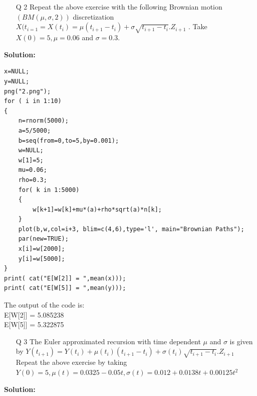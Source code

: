 \documentclass[12pt]{book}
\begin{document}
\newpage


\begin{enumerate}
\item[Q 2] Repeat the above exercise with the following Brownian motion $(BM(\mu,\sigma ,2 ))$ discretization $X(t_{i=1}= X(t_i)= \mu(t_{i+1}-t_i) + \sigma \sqrt{t_{i+1}-t_i}. Z_{i+1} $ . Take $X(0)=5 , \mu= 0.06 $ and $ \sigma =0.3 $.\\

\end{enumerate}
\textbf{Solution:}


\begin{lstlisting}
x=NULL;
y=NULL;
png("2.png");
for ( i in 1:10)
{
	n=rnorm(5000);
	a=5/5000;
	b=seq(from=0,to=5,by=0.001);
	w=NULL;
	w[1]=5;
	mu=0.06;
	rho=0.3;
	for( k in 1:5000)
	{
		w[k+1]=w[k]+mu*(a)+rho*sqrt(a)*n[k];
	}
	plot(b,w,col=i+3, blim=c(4,6),type='l', main="Brownian Paths");
	par(new=TRUE);
	x[i]=w[2000];
	y[i]=w[5000];
}
print( cat("E[W[2]] = ",mean(x)));
print( cat("E[W[5]] = ",mean(y)));
\end{lstlisting}
\newpage
The output of the code is:\\
E[W[2]] = 5.085238\\
E[W[5]] = 5.322875\\

\begin{figure}[H]
	\centering
\end{figure}
\begin{enumerate}
\newpage
\item[Q 3]The Euler approximated recursion with time dependent $\mu$ and $\sigma$ is given by \newline
$Y(t_{i+1})= Y(t_i)+ \mu(t_i)(t_{i+1}- t_i) + \sigma(t_i) \sqrt{{t_{i+1}-t_i}}. Z_{i+1}$ \newline
Repeat the above exercise by taking \newline $Y(0)=5,\mu(t) = 0.0325-0.05t, \sigma(t)=0.012+0.0138t+0.00125t^2$\\
\end{enumerate}
\textbf{Solution:}
\end{document}
